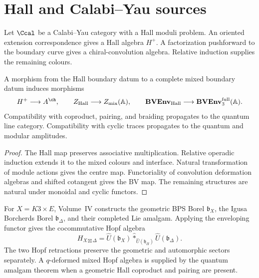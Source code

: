 \chapter{Hall and Calabi--Yau sources}
Let $\Ccal$ be a Calabi--Yau category with a Hall moduli problem.  An oriented extension correspondence gives a Hall algebra $H^+$.  A factorization pushforward to the boundary curve gives a chiral-convolution algebra.  Relative induction supplies the remaining colours.

\begin{theorem}
A morphism from the Hall boundary datum to a complete mixed boundary datum induces morphisms
\[
 H^+\longrightarrow A^{\ch},
 \qquad
 Z_{\mathrm{Hall}}\longrightarrow Z_{\mathrm{mix}}(\mathbb A),
 \qquad
 \BVEnv_{\mathrm{Hall}}\longrightarrow\BVEnv_3^{\mathrm{full}}(\mathbb A).
\]
Compatibility with coproduct, pairing, and braiding propagates to the quantum line category.  Compatibility with cyclic traces propagates to the quantum and modular amplitudes.
\end{theorem}
\begin{proof}
The Hall map preserves associative multiplication.  Relative operadic induction extends it to the mixed colours and interface.  Natural transformation of module actions gives the centre map.  Functoriality of convolution deformation algebras and shifted cotangent gives the BV map.  The remaining structures are natural under monoidal and cyclic functors.
\end{proof}

For $X=K3\times E$, Volume~IV constructs the geometric BPS Borel $\mathfrak b_X$, the Igusa Borcherds Borel $\mathfrak b_\Delta$, and their completed Lie amalgam.  Applying the enveloping functor gives the cocommutative Hopf algebra
\[
 H_{X\boxtimes\Delta}
 =\widehat U(\mathfrak b_X)
  \widehat *_{\widehat U(\mathfrak h_\Pi)}
  \widehat U(\mathfrak b_\Delta).
\]
The two Hopf retractions preserve the geometric and automorphic sectors separately.  A $q$-deformed mixed Hopf algebra is supplied by the quantum amalgam theorem when a geometric Hall coproduct and pairing are present.

